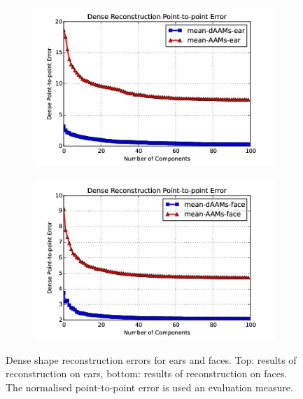 \begin{figure}[h]
    \centering
    \begin{subfigure}[b]{0.45\textwidth}
            \includegraphics[width=\textwidth]{supports/Model_Analysis/sr_ear}
    \end{subfigure}
    \hfill
    \begin{subfigure}[b]{0.45\textwidth}
            \includegraphics[width=\textwidth]{supports/Model_Analysis/sr_face}
    \end{subfigure}
    \caption{Dense shape reconstruction errors for ears and faces. Top: results of reconstruction on ears, bottom: results of reconstruction on faces. The normalised point-to-point error is used an evaluation measure.}
    \label{fig:rc_face}
\end{figure}


